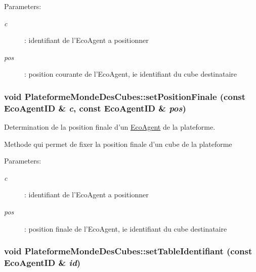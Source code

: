 \begin{Desc}
\item[Parameters:]
\begin{description}
\item[{\em c}]: identifiant de l'EcoAgent a positionner \item[{\em pos}]: position courante de l'EcoAgent, ie identifiant du cube destinataire \end{description}
\end{Desc}
\hypertarget{classPlateformeMondeDesCubes_315f30b3c7c1e8bc9ec828a66a5813e5}{
\subsubsection[{setPositionFinale}]{\setlength{\rightskip}{0pt plus 5cm}void PlateformeMondeDesCubes::setPositionFinale (const {\bf EcoAgentID} \& {\em c}, \/  const {\bf EcoAgentID} \& {\em pos})}}
\label{classPlateformeMondeDesCubes_315f30b3c7c1e8bc9ec828a66a5813e5}


Determination de la position finale d'un \hyperlink{classEcoAgent}{EcoAgent} de la plateforme. 

Methode qui permet de fixer la position finale d'un cube de la plateforme

\begin{Desc}
\item[Parameters:]
\begin{description}
\item[{\em c}]: identifiant de l'EcoAgent a positionner \item[{\em pos}]: position finale de l'EcoAgent, ie identifiant du cube destinataire \end{description}
\end{Desc}
\hypertarget{classPlateformeMondeDesCubes_cf6eccc70251d89c4d12c921f44934af}{
\subsubsection[{setTableIdentifiant}]{\setlength{\rightskip}{0pt plus 5cm}void PlateformeMondeDesCubes::setTableIdentifiant (const {\bf EcoAgentID} \& {\em id})}}
\label{classPlateformeMondeDesCubes_cf6eccc70251d89c4d12c921f44934af}


